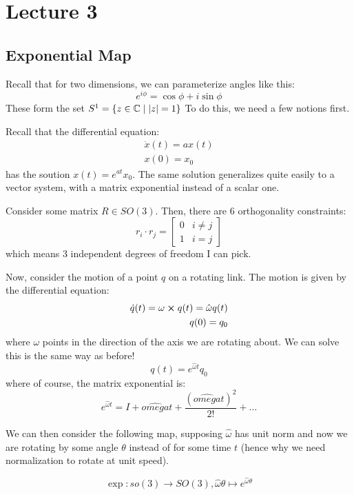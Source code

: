 \section{Lecture 3}

\subsection{Exponential Map}

Recall that for two dimensions, we can parameterize angles like this:
\[ e^{i \phi} = \cos \phi + i \sin \phi \]
These form the set $S^1 = \{z \in \operatorname{\mathbb{C}} \mid |z| = 1\}$
To do this, we need a few notions first.

Recall that the differential equation:
\begin{align*}
    \dot{x}(t) = ax(t) \\
    x(0) = x_0
\end{align*}
has the soution $x(t) = e^{at} x_0$. The same solution generalizes quite easily to a vector system,
with a matrix exponential instead of a scalar one.

Consider some matrix $R \in SO(3)$. Then, there are 6 orthogonality constraints:
\[ r_i \cdot r_j = \begin{bmatrix}
    0 & i \neq j \\
    1 & i = j
\end{bmatrix} \]
which means 3 independent degrees of freedom I can pick.

Now, consider the motion of a point $q$ on a rotating link. The motion is given by the differential equation:
\begin{align*}
    \dot{q}(t) = \omega \cross q(t) = \hat{\omega} q(t) \\
    q(0) = q_0
\end{align*}
where $\omega$ points in the direction of the axis we are rotating about.
We can solve this is the same way as before!
\[ q(t) = e^{\hat{\omega} t} q_0 \]
where of course, the matrix exponential is:
\[ e^{\hat{\omega} t} = I + \hat{omega}t + \frac{(\hat{omega} t)^2}{2!} + \dots \]

We can then consider the following map, supposing $\hat{\omega}$ has unit norm and now we are rotating by some angle $\theta$
instead of for some time $t$ (hence why we need normalization to rotate at unit speed).
\begin{definition}
    \[ \exp: so(3) \to SO(3), \hat{\omega} \theta \mapsto e^{\hat{\omega} \theta} \]
\end{definition}

